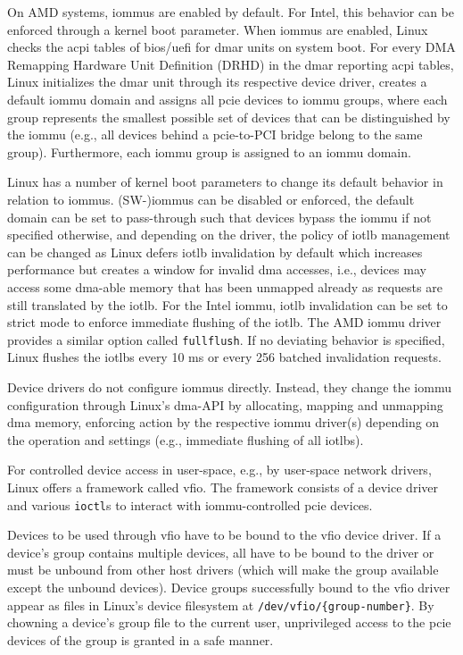 On AMD systems, \acp{iommu} are enabled by default. For Intel, this behavior can
be enforced through a kernel boot parameter. When \acp{iommu} are enabled, Linux
checks the \acs{acpi} tables of \ac{bios}/\ac{uefi} for \ac{dmar} units on
system boot. For every DMA Remapping Hardware Unit Definition (DRHD) in the
\ac{dmar} reporting \ac{acpi} tables, Linux initializes the \ac{dmar} unit
through its respective device driver, creates a default \ac{iommu} domain and
assigns all \ac{pcie} devices to \ac{iommu} groups, where each group represents
the smallest possible set of devices that can be distinguished by the \ac{iommu}
(e.g., all devices behind a \ac{pcie}-to-PCI bridge belong to the same group).
Furthermore, each \ac{iommu} group is assigned to an \ac{iommu} domain.

Linux has a number of kernel boot parameters to change its default behavior in
relation to \acp{iommu}. (SW-)\acp{iommu} can be disabled or enforced, the
default domain can be set to pass-through such that devices bypass the
\ac{iommu} if not specified otherwise, and depending on the driver, the policy
of \ac{iotlb} management can be changed as Linux defers \ac{iotlb} invalidation
by default which increases performance but creates a window for invalid \ac{dma}
accesses, i.e., devices may access some \ac{dma}-able memory that has been
unmapped already as requests are still translated by the \ac{iotlb}. For the
Intel \ac{iommu}, \ac{iotlb} invalidation can be set to strict mode to enforce
immediate flushing of the \ac{iotlb}. The AMD \ac{iommu} driver provides a
similar option called \texttt{fullflush}. If no deviating behavior is specified,
Linux flushes the \acp{iotlb} every 10 ms or every 256 batched invalidation
requests.

Device drivers do not configure \acp{iommu} directly. Instead, they change the
\ac{iommu} configuration through Linux's \ac{dma}-API by allocating, mapping and
unmapping \ac{dma} memory, enforcing action by the respective \ac{iommu}
driver(s) depending on the operation and settings (e.g., immediate flushing of
all \acp{iotlb}).

For controlled device access in user-space, e.g., by user-space network drivers,
Linux offers a framework called \ac{vfio}. The framework consists of a device
driver and various \texttt{ioctl}s to interact with \ac{iommu}-controlled
\ac{pcie} devices.

Devices to be used through \ac{vfio} have to be bound to the \ac{vfio} device
driver. If a device's group contains multiple devices, all have to be bound to
the driver or must be unbound from other host drivers (which will make the group
available except the unbound devices). Device groups successfully bound to the
\ac{vfio} driver appear as files in Linux's device filesystem at
\texttt{/dev/vfio/\{group-number\}}. By chowning a device's group file to the
current user, unprivileged access to the \ac{pcie} devices of the group is
granted in a safe manner.

